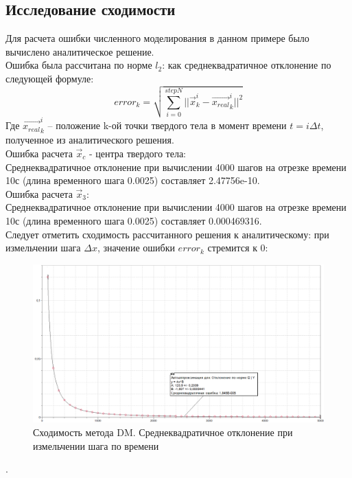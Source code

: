 \documentclass[12pt,a4paper]{article}
\begin{document}
\subsection{Исследование сходимости}
Для расчета ошибки численного моделирования в данном примере было вычислено аналитическое решение.\\
Ошибка была рассчитана по норме $l_2$: как среднеквадратичное отклонение по следующей формуле:
\[
error_k=\sqrt{\sum_{i=0}^{stepN}||\overrightarrow{x}_k^i-\overrightarrow{x_{real}}_k^i||^2}
\]
Где $\overrightarrow{x_{real}}_k^i$ – положение k-ой точки твердого тела в момент времени $t=i\Delta t$, полученное из аналитического решения.\\
Ошибка расчета $\overrightarrow{x}_c$ - центра твердого тела:\\
Среднеквадратичное отклонение при вычислении 4000 шагов на отрезке времени 10с (длина временного шага 0.0025) составляет 2.47756e-10.\\
Ошибка расчета $\overrightarrow{x}_3$:\\
Среднеквадратичное отклонение при вычислении 4000 шагов на отрезке времени 10с (длина временного шага 0.0025) составляет 0.000469316.\\
Следует отметить сходимость рассчитанного решения к аналитическому: при измельчении шага $\Delta x$, значение ошибки $error_k$ стремится к 0:\\
\begin{figure}[h!]
  \includegraphics[width=\linewidth]{Pictures/dm_error_convergence.png}
  \caption{Сходимость метода DM. Среднеквадратичное отклонение при измельчении шага по времени}
  \label{fig:dm_err}
\end{figure}
.\\
\end{document}

